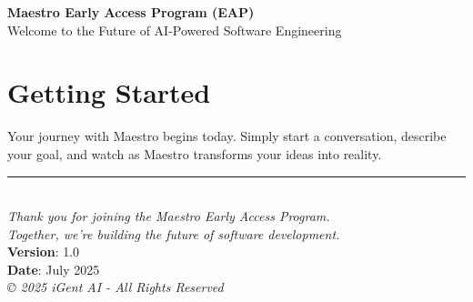 \documentclass[11pt,letterpaper]{article}
\begin{document}
\begin{center}
    {\Huge\bfseries\color{maestroBlue} Maestro Early Access Program (EAP)}\\[0.5cm]
    {\Large\color{darkGray} Welcome to the Future of AI-Powered Software Engineering}\\[1cm]
\end{center}





\section*{\color{maestroBlue}Getting Started}

Your journey with Maestro begins today. Simply start a conversation, describe your goal, and watch as Maestro transforms your ideas into reality.

\vfill

\begin{center}
    \rule{0.5\textwidth}{0.4pt}\\[0.4cm]
    \textit{Thank you for joining the Maestro Early Access Program.\\
    Together, we're building the future of software development.}\\[0.5cm]
    \textbf{Version}: 1.0\\
    \textbf{Date}: July 2025\\[0.2cm]
    \footnotesize\color{darkGray}\textit{© 2025 iGent AI - All Rights Reserved}
\end{center}
\end{document}

